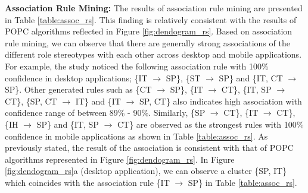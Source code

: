 \documentclass[AMA,Times1COL]{WileyNJDv5} %
\begin{document}
	
	\textbf{Association Rule Mining:}
	The  results of association rule mining are presented in Table \ref{table:assoc_rs}. This finding is relatively consistent with the results of POPC algorithms reflected in Figure \ref{fig:dendogram_rs}. Based on association rule mining, we can observe that there are generally strong associations of the different role stereotypes with each other across desktop and mobile applications. For example, the study noticed the following association rule with 100\% confidence in desktop applications; \{IT $\rightarrow$ SP\}, \{ST $\rightarrow$ SP\} and \{IT, CT $\rightarrow$ SP\}. Other generated rules such as \{CT $\rightarrow$ SP\}, \{IT $\rightarrow$ CT\}, \{IT, SP $\rightarrow$ CT\}, \{SP, CT $\rightarrow$ IT\} and \{IT $\rightarrow$ SP, CT\} also indicates high association with confidence range of between 89\% - 90\%. Similarly, \{SP $\rightarrow$ CT\}, \{IT $\rightarrow$ CT\}, \{IH $\rightarrow$ SP\} and \{IT, SP $\rightarrow$ CT\} are observed as the strongest rules with 100\% confidence in mobile applications as shown in Table \ref{table:assoc_rs}.
	As previously stated, the result of  the association is consistent with that of POPC algorithms represented in Figure \ref{fig:dendogram_rs}. In Figure \ref{fig:dendogram_rs}a (desktop application), we can observe a cluster \{SP, IT\} which coincides with the association rule \{IT $\rightarrow$ SP\} in Table \ref{table:assoc_rs}.
	
\end{document}
